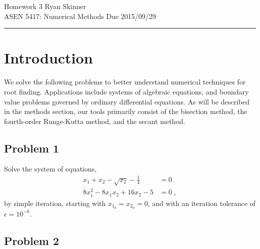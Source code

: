 \documentclass[12pt]{article}
\begin{document}
\pagestyle{fancyplain}
\lhead{}
\chead{}
\rhead{}
\cfoot{\hrule \thepage}

\noindent
{\Large Homework 3}
\hfill
{\large Ryan Skinner}
\\[0.5ex]
{\large ASEN 5417: Numerical Methods}
\hfill
{\large Due 2015/09/29}\\
\hrule
\vspace{6pt}

\section{Introduction} %

We solve the following problems to better understand numerical techniques for root finding. Applications include systems of algebraic equations, and boundary value problems governed by ordinary differential equations. As will be described in the methods section, our tools primarily consist of the bisection method, the fourth-order Runge-Kutta method, and the secant method.

\subsection{Problem 1}

Solve the system of equations,
\begin{equation}
\begin{alignedat}{2}
x_1 + x_2 - \sqrt{x_2} - \tfrac{1}{4} &= 0 \\
8 x_1^2 - 8 x_1 x_2 + 16 x_2 - 5      &= 0
\;,
\end{alignedat}
\label{eq:prob1}
\end{equation}
by simple iteration, starting with $x_{1_0} = x_{2_0} = 0$, and with an iteration tolerance of $\epsilon = 10^{-6}$.

\subsection{Problem 2}
\end{document}
